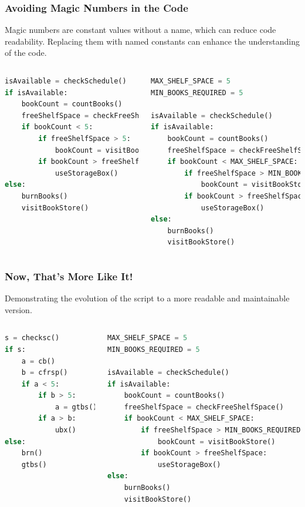 \begin{frame}[fragile]
 \frametitle{Avoiding Magic Numbers in the Code}
 Magic numbers are constant values without a name, which can reduce code readability. Replacing them with named constants can enhance the understanding of the code.
 \begin{columns}[T]
     \begin{lstlisting}[language=Python,basicstyle=\scriptsize\ttfamily]
isAvailable = checkSchedule()
if isAvailable:
    bookCount = countBooks()
    freeShelfSpace = checkFreeShelfSpace()
    if bookCount < 5:
        if freeShelfSpace > 5:
            bookCount = visitBookStore()
        if bookCount > freeShelfSpace:
            useStorageBox()
else:
    burnBooks()
    visitBookStore()
 \end{lstlisting}
     \begin{lstlisting}[language=Python,basicstyle=\scriptsize\ttfamily,emph={MIN_BOOKS_REQUIRED,MAX_SHELF_SPACE},emphstyle=\color{red}]
MAX_SHELF_SPACE = 5
MIN_BOOKS_REQUIRED = 5

isAvailable = checkSchedule()
if isAvailable:
    bookCount = countBooks()
    freeShelfSpace = checkFreeShelfSpace()
    if bookCount < MAX_SHELF_SPACE:
        if freeShelfSpace > MIN_BOOKS_REQUIRED:
            bookCount = visitBookStore()
        if bookCount > freeShelfSpace:
            useStorageBox()
else:
    burnBooks()
    visitBookStore()
 \end{lstlisting}
 \end{columns}
\end{frame}

\begin{frame}[fragile]
 \frametitle{Now, That's More Like It!}
 Demonstrating the evolution of the script to a more readable and maintainable version.
 \begin{columns}[T]
     \begin{lstlisting}[language=Python]
s = checksc()
if s:
    a = cb()
    b = cfrsp()
    if a < 5:
        if b > 5:
            a = gtbs()
        if a > b:
            ubx()
else:
    brn()
    gtbs()
 \end{lstlisting}
     \begin{lstlisting}[language=Python]
MAX_SHELF_SPACE = 5
MIN_BOOKS_REQUIRED = 5

isAvailable = checkSchedule()
if isAvailable:
    bookCount = countBooks()
    freeShelfSpace = checkFreeShelfSpace()
    if bookCount < MAX_SHELF_SPACE:
        if freeShelfSpace > MIN_BOOKS_REQUIRED:
            bookCount = visitBookStore()
        if bookCount > freeShelfSpace:
            useStorageBox()
else:
    burnBooks()
    visitBookStore()
 \end{lstlisting}
 \end{columns}
\end{frame}


